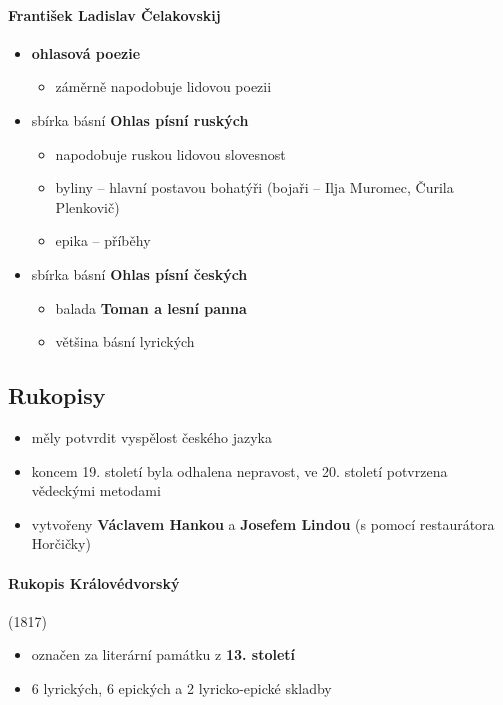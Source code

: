 \paragraph{František Ladislav Čelakovskij}
\begin{itemize}
\item \textbf{ohlasová poezie}
	\begin{itemize}
	\item záměrně napodobuje lidovou poezii
	\end{itemize}
\item sbírka básní \textbf{Ohlas písní ruských}
	\begin{itemize}
	\item napodobuje ruskou lidovou slovesnost
	\item byliny -- hlavní postavou bohatýři (bojaři -- Ilja Muromec, Čurila Plenkovič)
	\item epika -- příběhy
	\end{itemize}
\item sbírka básní \textbf{Ohlas písní českých}
	\begin{itemize}
	\item balada \textbf{Toman a lesní panna}
	\item většina básní lyrických
	\end{itemize}
\end{itemize}

\subsection{Rukopisy}
\begin{itemize}
\item měly potvrdit vyspělost českého jazyka
\item koncem 19. století byla odhalena nepravost, ve 20. století potvrzena vědeckými metodami
\item vytvořeny \textbf{Václavem Hankou} a \textbf{Josefem Lindou} (s pomocí restaurátora Horčičky)
\end{itemize}

\paragraph{Rukopis Královédvorský} (1817)
\begin{itemize}
\item označen za literární památku z \textbf{13. století}
\item 6 lyrických, 6 epických a 2 lyricko-epické skladby
\end{itemize}

